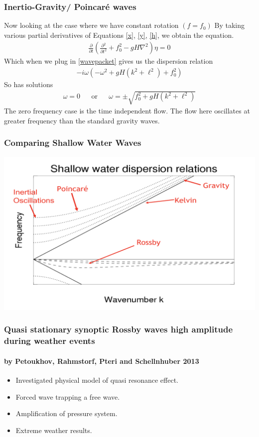 \documentclass{beamer}
\newcommand{\grad}{\nabla}
\newcommand{\partiald}[2]{\frac{\partial {#1} }{\partial {#2}}}
\begin{document}
\begin{frame}
\frametitle{Inertio-Gravity/ Poincaré waves}
Now looking at the case where we have constant rotation $(f=f_0)$
By taking various partial derivatives of Equations \eqref{x}, \eqref{y}, \eqref{h}, we obtain the equation.
\begin{align}
\partiald{}{t}\left(\partiald{^2}{t^2}+f_0^2-gH\grad^2\right)\eta=0
\end{align}
Which when we plug in \eqref{wavepacket} gives us the dispersion relation
\begin{align}
-i\omega(-\omega^2+gH(k^2+\ell^2)+f_0^2)
\end{align}
So has solutions
\begin{align}
\omega=0 && \mathrm{or} && \omega=\pm\sqrt{f_0^2+gH(k^2+\ell^2)}
\end{align}
The zero frequency case is the time independent flow. The flow here oscillates at greater frequency than the standard gravity waves.

\end{frame}
\begin{frame}
\frametitle{Comparing Shallow Water Waves}
\centering\includegraphics[scale=0.25]{"Shallow Water Waves"}

\end{frame}
 \begin{frame}
 \frametitle{Quasi stationary synoptic Rossby waves high amplitude during weather events }
\framesubtitle{by Petoukhov, Rahmstorf, Pteri and Schellnhuber 2013}
\begin{itemize}
	\item Investigated physical model of quasi resonance effect.
	\item Forced wave trapping a free wave.
	\item Amplification of pressure system.
	\item Extreme weather results.
\end{itemize}


\end{frame}
\end{document}
